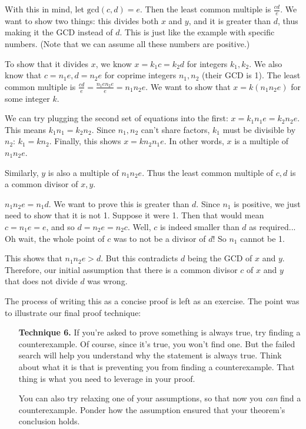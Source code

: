 \documentclass[11pt]{article}
\begin{document}
    With this in mind, let $\mathrm{gcd}(c,d)=e$. Then the least common multiple is
    $\frac{cd}e$. We want to show two things: this divides both $x$ and $y$, and it
    is greater than $d$, thus making it the GCD instead of $d$. This is just like the
    example with specific numbers. (Note that we can assume all these numbers are positive.)
    
    To show that it divides $x$, we know $x=k_1c=k_2d$ for integers $k_1,k_2$. 
    We also know that $c=n_1e,d=n_2e$ for coprime integers $n_1,n_2$ (their GCD is 1).
    The least common multiple is $\frac{cd}e=\frac{n_1en_2e}e=n_1n_2e$. We want to show
    that $x=k(n_1n_2e)$ for some integer $k$.
    
    We can try plugging the second set of equations into the first: $x=k_1n_1e=k_2n_2e$.
    This means $k_1n_1=k_2n_2$. Since $n_1,n_2$ can't share factors, $k_1$ must be
    divisible by $n_2$: $k_1=kn_2$. Finally, this shows $x=kn_2n_1e$. In other words,
    $x$ is a multiple of $n_1n_2e$.
    
    Similarly, $y$ is also a multiple of $n_1n_2e$. Thus the least common multiple of
    $c,d$ is a common divisor of $x,y$.
    
    $n_1n_2e=n_1d$. We want to prove this is greater than $d$. Since $n_1$ is positive,
    we just need to show that it is not 1. Suppose it were 1. Then that would mean
    $c=n_1e=e$, and so $d=n_2e=n_2c$. Well, $c$ is indeed smaller than $d$ as required...
    Oh wait, the whole point of $c$ was to not be a divisor of $d$! So $n_1$ cannot be 1.
    
    This shows that $n_1n_2e>d$. But this contradicts $d$ being the GCD of $x$
    and $y$. Therefore, our initial assumption that there is a common divisor $c$ of
    $x$ and $y$ that does not divide $d$ was wrong.
    
    The process of writing this as a concise proof is left as an exercise. The point was
    to illustrate our final proof technique:

    \begin{enumerate}
        \item[\textbf{Technique 6.}]
        If you're asked to prove something is always true, try finding a counterexample.
        Of course, since it's true, you won't find one. But the failed search will help
        you understand why the statement is always true. Think about what it is that is
        preventing you from finding a counterexample. That thing is what you need to
        leverage in your proof.
        
        You can also try relaxing one of your assumptions, so that now you \textit{can}
        find a counterexample. Ponder how the assumption ensured that your theorem's
        conclusion holds.
        
    \end{enumerate}
    
\end{document}
